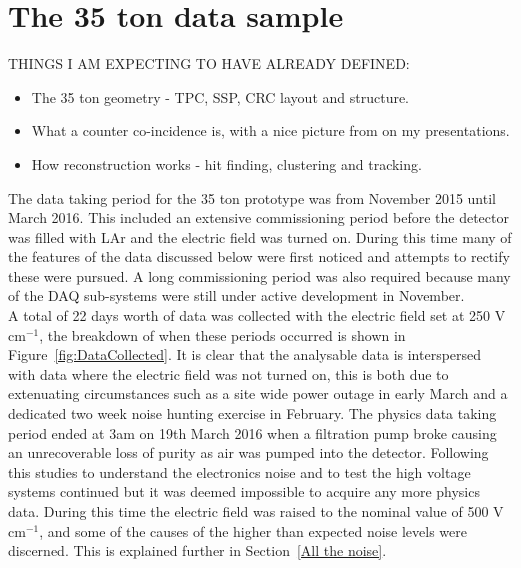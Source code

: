 \chapter{The 35 ton data sample}  %

THINGS I AM EXPECTING TO HAVE ALREADY DEFINED:
\begin{itemize}
\item The 35 ton geometry - TPC, SSP, CRC layout and structure.
\item What a counter co-incidence is, with a nice picture from on my presentations. 
\item How reconstruction works - hit finding, clustering and tracking.
\end{itemize}
  
\graphicspath{{35tonData/Figs/PDF/}{35tonData/Figs/Raster/}{35tonData/Figs/Vector/}}

The data taking period for the 35 ton prototype was from November 2015 until March 2016. This included an extensive commissioning period before the detector was filled with LAr and the electric field was turned on. During this time many of the features of the data discussed below were first noticed and attempts to rectify these were pursued. A long commissioning period was also required because many of the DAQ sub-systems were still under active development in November.\\

A total of 22 days worth of data was collected with the electric field set at 250 V cm$^{-1}$, the breakdown of when these periods occurred is shown in Figure~\ref{fig:DataCollected}. It is clear that the analysable data is interspersed with data where the electric field was not turned on, this is both due to extenuating circumstances such as a site wide power outage in early March and a dedicated two week noise hunting exercise in February. The physics data taking period ended at 3am on 19th March 2016 when a filtration pump broke causing an unrecoverable loss of purity as air was pumped into the detector. Following this studies to understand the electronics noise and to test the high voltage systems continued but it was deemed impossible to acquire any more physics data. During this time the electric field was raised to the nominal value of 500  V cm$^{-1}$, and some of the causes of the higher than expected noise levels were discerned. This is explained further in Section~\ref{All the noise}. 

